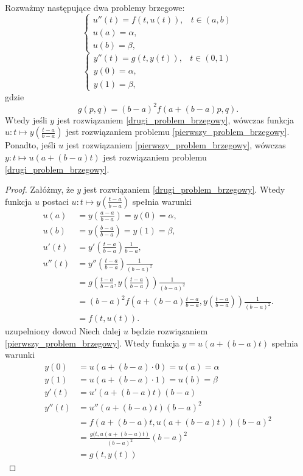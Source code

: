 \begin{theorem}
Rozważmy następujące dwa problemy brzegowe:
\begin{equation}\label{pierwszy_problem_brzegowy}
\left\{\begin{array}{ll}
u''(t)=f(t,u(t)), & t \in (a,b) \\
u(a)=\alpha, & \\
u(b)=\beta,
\end{array}\right.
\end{equation}
\begin{equation}\label{drugi_problem_brzegowy}
\left\{\begin{array}{ll}
y''(t)=g(t,y(t)), &  t \in (0,1)\\
y(0)= \alpha, & \\
y(1)= \beta,
\end{array}\right.
\end{equation}
gdzie 
$$
g(p,q) = (b-a)^2f(a+(b-a)p,q).
$$
Wtedy jeśli $y$ jest rozwiązaniem \eqref{drugi_problem_brzegowy}, wówczas funkcja $u: t \mapsto y\left(\frac{t-a}{b-a}\right)$ jest rozwiązaniem problemu \eqref{pierwszy_problem_brzegowy}. Ponadto, jeśli $u$ jest rozwiązaniem \eqref{pierwszy_problem_brzegowy}, wówczas $y: t \mapsto u(a+(b-a)t)$ jest rozwiązaniem problemu \eqref{drugi_problem_brzegowy}.
\end{theorem}
\begin{proof}
Załóżmy, że $y$ jest rozwiązaniem \eqref{drugi_problem_brzegowy}. Wtedy funkcja $u$ postaci $u: t \mapsto y\left(\frac{t-a}{b-a}\right)$ spełnia warunki
\begin{align*}
u(a) &= y\left(\frac{a-a}{b-a}\right)= y(0) = \alpha, \\
u(b) &= y\left(\frac{b-a}{b-a}\right)= y(1) = \beta, \\
u'(t) &= y'\left(\frac{t-a}{b-a}\right)\frac{1}{b-a}, \\
u''(t) &= y''\left(\frac{t-a}{b-a}\right)\frac{1}{(b-a)^2} \\
&= g\left(\frac{t-a}{b-a},y\left(\frac{t-a}{b-a}\right)\right) \frac{1}{(b-a)^2}\\
&= (b-a)^2f\left(a+(b-a)\frac{t-a}{b-a},y\left(\frac{t-a}{b-a}\right)\right)\frac{1}{(b-a)^2}. \\
&= f(t,u(t)).
\end{align*}
{\color{red} uzupelniony dowod}
Niech dalej $u$ będzie rozwiązaniem \eqref{pierwszy_problem_brzegowy}. Wtedy funkcja $y = u(a+(b-a)t)$ spełnia warunki
\begin{align*}
y(0) &= u(a+(b-a)\cdot 0) = u(a) = \alpha \\
y(1) &= u(a+(b-a)\cdot 1) = u(b) = \beta \\
y'(t) &= u'(a+(b-a)t)(b-a) \\
y''(t) &=  u''(a+(b-a)t)(b-a)^2 \\
&= f(a+(b-a)t, u(a+(b-a)t))(b-a)^2 \\
&= \frac{g(t,u(a+(b-a)t)}{(b-a)^2}(b-a)^2 \\
&= g(t,y(t))
\end{align*}
\end{proof}

